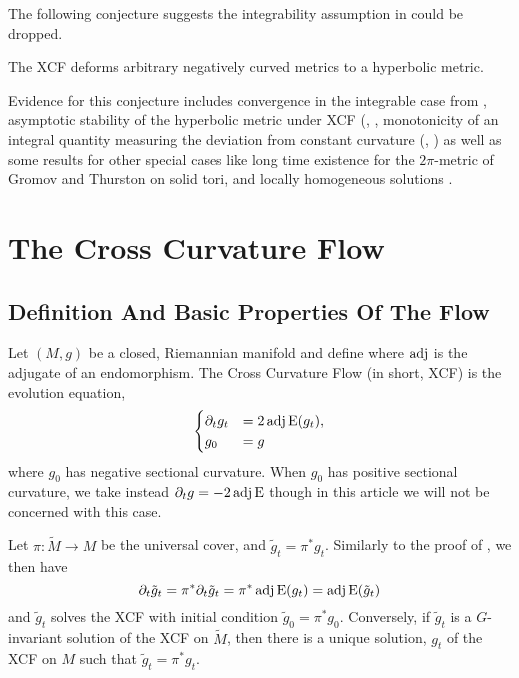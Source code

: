 \documentclass[a4paper,12pt]{amsart}
\begin{document}
The following conjecture suggests the integrability assumption in  could be dropped.

\begin{conj}[\cite{MR2055396}]
\label{conj:chow_hamilton}

The XCF deforms arbitrary negatively curved metrics to a hyperbolic metric.
\end{conj}

Evidence for this conjecture includes convergence in the integrable case from , asymptotic stability of the hyperbolic metric under XCF (\cite{MR2448593}, , monotonicity of an integral quantity measuring the deviation from constant curvature (\cite{MR2055396}, ) as well as some results for other special cases like long time existence for the \(2\pi\)-metric of Gromov and Thurston on solid tori, and locally homogeneous solutions \cite{}.

\section{The Cross Curvature Flow}
\label{sec:xcf}
\subsection{Definition And Basic Properties Of The Flow}
\label{subsec:xcf_defn}

Let \((M, g)\) be a closed, Riemannian manifold and define
where $\operatorname{adj}$ is the adjugate of an endomorphism. The Cross Curvature Flow (in short, XCF) is the evolution equation,
\begin{equation}
\label{eq:xcf}
\begin{cases}
\partial_t g_t  &= 2 \operatorname{adj}\operatorname{E}(g_t), \\
g_0 &= g
\end{cases}
\end{equation}
where \(g_0\) has negative sectional curvature. When \(g_0\) has positive sectional curvature, we take instead \(\partial_t g = -2\operatorname{adj}\operatorname{E}\) though in this article we will not be concerned with this case.
\begin{rem}
Let \(\pi : \tilde{M} \to M\) be the universal cover, and \(\tilde{g}_t = \pi^{\ast} g_t\). Similarly to the proof of , we then have
\[
\partial_t \tilde{g}_t = \pi^{\ast} \partial_t \tilde{g}_t = \pi^{\ast} \operatorname{adj}\operatorname{E}(g_t) = \operatorname{adj}\operatorname{E}(\tilde{g}_t)
\]
and \(\tilde{g}_t\) solves the XCF with initial condition \(\tilde{g}_0 = \pi^{\ast} g_0\). Conversely, if \(\tilde{g}_t\) is a \(G\)-invariant solution of the XCF on \(\tilde{M}\), then there is a unique solution, \(g_t\) of the XCF on \(M\) such that \(\tilde{g}_t = \pi^{\ast} g_t\).
\end{rem}
\end{document}
